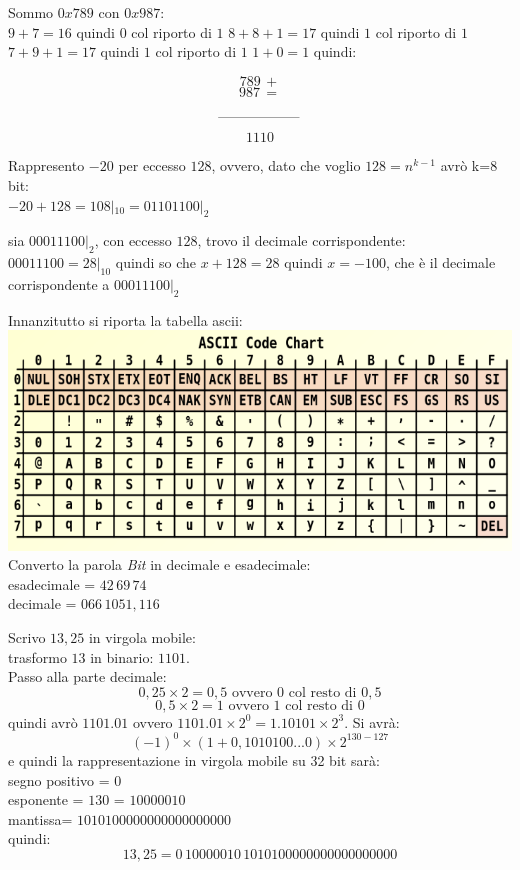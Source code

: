 \documentclass[a4paper,12pt, oneside]{book}
\begin{document}
\begin{esercizio}
Sommo $0x789$ con $0x987$:\\
$9+7=16$ quindi $0$ col riporto di $1$
$8+8+1=17$ quindi $1$ col riporto di $1$
$7+9+1=17$ quindi $1$ col riporto di $1$
$1+0=1$
quindi:

$$789\,+$$
$$987\,=$$
$$\rule{60pt}{.4pt}$$
$$1110$$
\end{esercizio}
\begin{esercizio}
Rappresento $-20$ per eccesso $128$, ovvero, dato che voglio $128=n^{k-1}$ avrò k=8 bit:\\
$-20+128=108|_{10}=01101100|_2$
\end{esercizio}
\begin{esercizio}
sia $00011100|_2$, con eccesso $128$, trovo il decimale corrispondente:\\
$00011100=28|_{10}$ quindi so che $x+128=28$ quindi $x=-100$, che è il decimale corrispondente a $00011100|_2$
\end{esercizio}
\begin{esercizio}
Innanzitutto si riporta la tabella ascii:\\
\includegraphics[scale=0.5]{img/ascii.png}
Converto la parola \textit{Bit} in decimale e esadecimale:\\
esadecimale = $42\,69\,74$\\
decimale = $ 066\,1051,116$
\end{esercizio}
\begin{esercizio}
Scrivo $13,25$ in virgola mobile:\\
trasformo $13$ in binario: $1101$.\\
Passo alla parte decimale:\\
$$0,25\times 2=0,5 \mbox{ ovvero } 0 \mbox{ col resto di } 0,5$$
$$0,5\times 2=1 \mbox{ ovvero } 1 \mbox{ col resto di } 0$$
quindi avrò $1101.01$ ovvero $1101.01\times 2^0=1.10101\times 2^3$. Si avrà:
$$(-1)^0\times (1+0,1010100...0)\times 2^{130-127}$$
e quindi la rappresentazione in virgola mobile su 32 bit  sarà:\\
segno positivo = $0$\\
esponente = $130$ = $10000010$\\
mantissa= $1010100000000000000000$\\
quindi:
$$13,25=0\,10000010\,1010100000000000000000$$
\end{esercizio}
\end{document}
